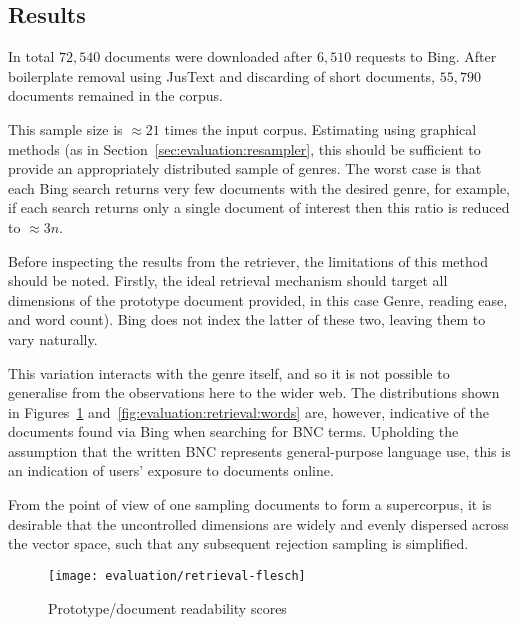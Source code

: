\subsection{Results}
\label{sec:evaluation:results}

In total $72,540$ documents were downloaded after $6,510$ requests to Bing.  After boilerplate removal using JusText\cite{pomikalek2013justext} and discarding of short documents, $55,790$ documents remained in the corpus.


This sample size is $\approx 21$ times the input corpus.  Estimating using graphical methods (as in Section~\ref{sec:evaluation:resampler}, this should be sufficient to provide an appropriately distributed sample of genres.  The worst case is that each Bing search returns very few documents with the desired genre, for example, if each search returns only a single document of interest then this ratio is reduced to $\approx 3n$.



Before inspecting the results from the retriever, the limitations of this method should be noted.  Firstly, the ideal retrieval mechanism should target all dimensions of the prototype document provided, in this case Genre, reading ease, and word count).  Bing does not index the latter of these two, leaving them to vary naturally.

This variation interacts with the genre itself, and so it is not possible to generalise from the observations here to the wider web.  The distributions shown in Figures~\ref{fig:evaluation:retrieval:flesh} and~\ref{fig:evaluation:retrieval:words} are, however, indicative of the documents found via Bing when searching for BNC terms.  Upholding the assumption that the written BNC represents general-purpose language use, this is an indication of users' exposure to documents online.%

From the point of view of one sampling documents to form a supercorpus, it is desirable that the uncontrolled dimensions are widely and evenly dispersed across the vector space, such that any subsequent rejection sampling is simplified.


\begin{figure}[ht]
    \centering
    \texttt{[image: evaluation/retrieval-flesch]}
    \caption{Prototype/document readability scores}
    \label{fig:evaluation:retrieval:flesh}
\end{figure}

